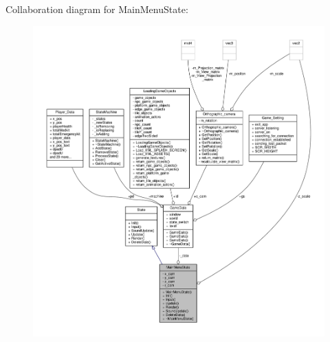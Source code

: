 Collaboration diagram for Main\+Menu\+State\+:
\nopagebreak
\begin{figure}[H]
\begin{center}
\leavevmode
\includegraphics[width=350pt]{classMainMenuState__coll__graph}
\end{center}
\end{figure}
